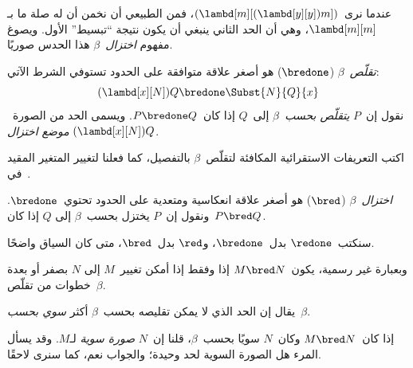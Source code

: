 \documentclass[../../../include/open-logic-section]{subfiles}
\begin{document}

عندما نرى~$(\lambd[m][(\lambd[y][y]) m])$، فمن الطبيعي أن نخمن أن له
صلة ما بـ$\lambd[m][m]$، وهي أن الحد الثاني ينبغي أن يكون نتيجة
``تبسيط'' الأول. ويصوغ مفهوم \emph{اختزال~$\beta$} هذا الحدس صوريًا.

\begin{defn} 
  \emph{تقلّص~$\beta$} ($\bredone$) هو أصغر علاقة متوافقة على الحدود
  تستوفي الشرط الآتي:
  \[
    (\lambd[x][N])Q \bredone \Subst{N}{Q}{x} 
  \]
  نقول إن~$P$ \emph{يتقلّص بحسب~$\beta$} إلى~$Q$ إذا كان~$P \bredone
  Q$. ويسمى الحد من الصورة~$(\lambd[x][N])Q$ \emph{موضع اختزال}.
\end{defn}

\begin{prob} 
  اكتب التعريفات الاستقرائية المكافئة لتقلّص~$\beta$ بالتفصيل، كما فعلنا
  لتغيير المتغير المقيد في~.
\end{prob}
  
\begin{defn} 
  \emph{اختزال~$\beta$} ($\bred$) هو أصغر علاقة انعكاسية ومتعدية على
  الحدود تحتوي~$\bredone$. ونقول إن~$P$ يختزل بحسب~$\beta$ إلى
  $Q$ إذا كان~$P \bred Q$.
\end{defn}

سنكتب~$\redone$ بدل~$\bredone$، و$\red$ بدل~$\bred$، متى كان السياق
واضحًا.

وبعبارة غير رسمية، يكون~$M \bred N$ إذا وفقط إذا أمكن تغيير~$M$ إلى
$N$ بصفر أو بعدة خطوات من تقلّص~$\beta$.

\begin{defn}
يقال إن الحد الذي لا يمكن تقليصه بحسب~$\beta$ أكثر \emph{سوي بحسب~$\beta$}.
\end{defn}

إذا كان~$M \bred N$ وكان~$N$ سويًا بحسب~$\beta$، قلنا إن~$N$
\emph{صورة سوية} لـ$M$. وقد يسأل المرء هل الصورة السوية لحد وحيدة؛
والجواب نعم، كما سنرى لاحقًا.
\end{document}
